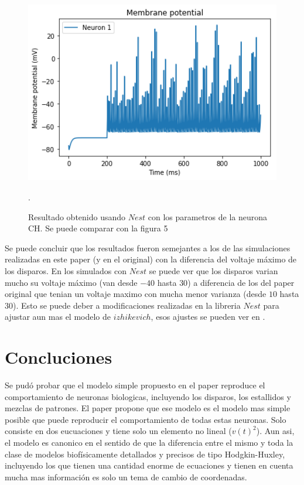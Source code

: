 \documentclass[12pt]{article}
\begin{document}
\begin{figure}[h!]
    \centering
        \includegraphics[height=8cm]{images/CH_nest.png}
    \caption[fontsize=2pt]{Resultado obtenido usando $Nest$ con los parametros de la neurona CH. Se puede comparar con la figura 5}.
\end{figure}

\newpage

Se puede concluir que los resultados fueron semejantes a los de las simulaciones realizadas en este paper (y en el original) con la diferencia del voltaje máximo de los disparos.
En los simulados con $Nest$ se puede ver que los disparos varian mucho su voltaje máximo (van desde $-40$ hasta $30$) a diferencia de los del paper original que tenian un voltaje maximo con mucha menor varianza (desde $10$ hasta $30$).
Esto se puede deber a modificaciones realizadas en la libreria $Nest$ para ajustar aun mas el modelo de $izhikevich$, esos ajustes se pueden ver en \cite{nest_izhikevich}.

\newpage

\section{Concluciones}

Se pudó probar que el modelo simple propuesto en el paper reproduce el comportamiento de neuronas biologicas, incluyendo los disparos, los estallidos y mezclas de patrones. El paper propone que ese modelo es el modelo mas simple posible que puede reproducir el comportamiento de todas estas neuronas.
Solo consiste en dos eucuaciones y tiene solo un elemento no lineal ($v(t)^2$).
Aun asi, el modelo es canonico en el sentido de que la diferencia entre el mismo y toda la clase de modelos biofísicamente detallados y precisos de tipo Hodgkin-Huxley, incluyendo los que tienen una cantidad enorme de ecuaciones y tienen en cuenta mucha mas información es solo un tema de cambio de coordenadas. \\
\end{document}
